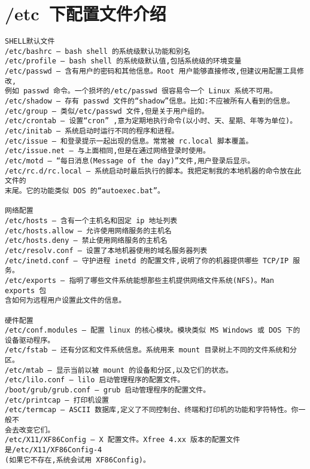 \section{/etc~下配置文件介绍}
\begin{verbatim}
SHELL默认文件
/etc/bashrc – bash shell 的系统级默认功能和别名 
/etc/profile – bash shell 的系统级默认值,包括系统级的环境变量 
/etc/passwd – 含有用户的密码和其他信息。Root 用户能够直接修改,但建议用配置工具修改,
例如 passwd 命令。一个损坏的/etc/passwd 很容易令一个 Linux 系统不可用。 
/etc/shadow – 存有 passwd 文件的“shadow”信息。比如:不应被所有人看到的信息。 
/etc/group – 类似/etc/passwd 文件,但是关于用户组的。 
/etc/crontab – 设置“cron” ,意为定期地执行命令(以小时、天、星期、年等为单位)。 
/etc/initab – 系统启动时运行不同的程序和进程。 
/etc/issue – 和登录提示一起出现的信息。常常被 rc.local 脚本覆盖。 
/etc/issue.net – 与上面相同,但是在通过网络登录时使用。 
/etc/motd – “每日消息(Message of the day)”文件,用户登录后显示。 
/etc/rc.d/rc.local – 系统启动时最后执行的脚本。我把定制我的本地机器的命令放在此文件的
末尾。它的功能类似 DOS 的“autoexec.bat”。 
                                    
网络配置 
/etc/hosts – 含有一个主机名和固定 ip 地址列表 
/etc/hosts.allow – 允许使用网络服务的主机名 
/etc/hosts.deny – 禁止使用网络服务的主机名 
/etc/resolv.conf – 设置了本地机器使用的域名服务器列表 
/etc/inetd.conf – 守护进程 inetd 的配置文件,说明了你的机器提供哪些 TCP/IP 服务。 
/etc/exports – 指明了哪些文件系统能想那些主机提供网络文件系统(NFS)。Man exports 包
含如何为远程用户设置此文件的信息。 
 
硬件配置 
/etc/conf.modules – 配置 linux 的核心模块。模块类似 MS Windows 或 DOS 下的设备驱动程序。 
/etc/fstab – 还有分区和文件系统信息。系统用来 mount 目录树上不同的文件系统和分区。 
/etc/mtab – 显示当前以被 mount 的设备和分区,以及它们的状态。 
/etc/lilo.conf – lilo 启动管理程序的配置文件。 
/boot/grub/grub.conf – grub 启动管理程序的配置文件。 
/etc/printcap – 打印机设置 
/etc/termcap – ASCII 数据库,定义了不同控制台、终端和打印机的功能和字符特性。你一般不
会去改变它们。 
/etc/X11/XF86Config – X 配置文件。Xfree 4.xx 版本的配置文件是/etc/X11/XF86Config-4
(如果它不存在,系统会试用 XF86Config)。 
\end{verbatim}

